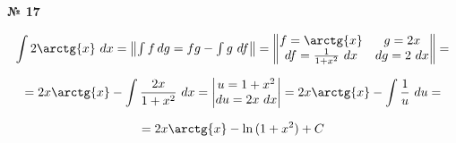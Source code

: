 \documentclass{article}
\begin{document}
\textbf{№ 17} 
\large

$$ \int 2\arctg{x} \ dx 
= \begin{Vmatrix} \int f \,dg = fg - \int g \ df \end{Vmatrix} 
= \begin{Vmatrix} f = \arctg{x} & g = 2x \\
                  df = \frac{1}{1+x^2} \ dx  & dg = 2 \ dx \end{Vmatrix} 
= $$

$$ = 2x\arctg{x} - \int \frac{2x}{1+x^2} \ dx
= \begin{vmatrix} u = 1+x^2 \\
                   du = 2x \ dx \end{vmatrix}
= 2x\arctg{x} - \int \frac{1}{u} \ du
= $$

$$ = 2x\arctg{x} - \ln{(1+x^2)} + C$$
\end{document}
